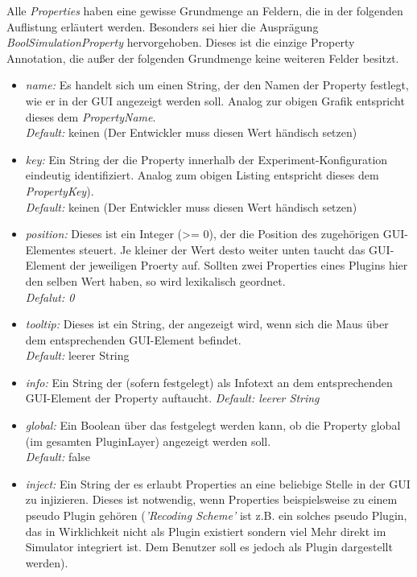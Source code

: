 \documentclass[a4paper, 11pt]{article} %
\begin{document}
Alle \emph{Properties} haben eine gewisse Grundmenge an Feldern, die in der folgenden Auflistung erläutert werden. Besonders sei hier die Ausprägung \emph{BoolSimulationProperty} hervorgehoben. Dieses ist die einzige Property Annotation, die außer der folgenden Grundmenge keine weiteren Felder besitzt.
\begin{itemize}
	\item \emph{name:} Es handelt sich um einen String, der den Namen der Property festlegt, wie er in der GUI angezeigt werden soll. Analog zur obigen Grafik entspricht dieses dem \emph{PropertyName}.\\
	\emph{Default:} keinen (Der Entwickler muss diesen Wert händisch setzen)
	\item \emph{key:} Ein String der die Property innerhalb der Experiment-Konfiguration eindeutig identifiziert. Analog zum obigen Listing entspricht dieses dem \emph{PropertyKey}).\\
	\emph{Default:} keinen (Der Entwickler muss diesen Wert händisch setzen)
	\item \emph{position:} Dieses ist ein Integer (>= 0), der die Position des zugehörigen GUI-Elementes steuert. Je kleiner der Wert desto weiter unten taucht das GUI-Element der jeweiligen Proerty auf. Sollten zwei Properties eines Plugins hier den selben Wert haben, so wird lexikalisch geordnet.\\
	\emph{Defalut: 0}\\
	\item \emph{tooltip:} Dieses ist ein String, der angezeigt wird, wenn sich die Maus über dem entsprechenden GUI-Element befindet.\\
	\emph{Default:} leerer String 
	\item \emph{info:} Ein String der (sofern festgelegt) als Infotext an dem entsprechenden GUI-Element der Property auftaucht.  
	\emph{Default: leerer String}
	\item \emph{global:} Ein Boolean über das festgelegt werden kann, ob die Property global (im gesamten PluginLayer) angezeigt werden soll.\\
	\emph{Default:} false
	\item \emph{inject:} Ein String der es erlaubt Properties an eine beliebige Stelle in der GUI zu injizieren. Dieses ist notwendig, wenn Properties beispielsweise zu einem pseudo Plugin gehören (\emph{'Recoding Scheme'} ist z.B. ein solches pseudo Plugin, das in Wirklichkeit nicht als Plugin existiert sondern viel Mehr direkt im Simulator integriert ist. Dem Benutzer soll es jedoch als Plugin dargestellt werden). \\

\end{itemize}
\end{document}
